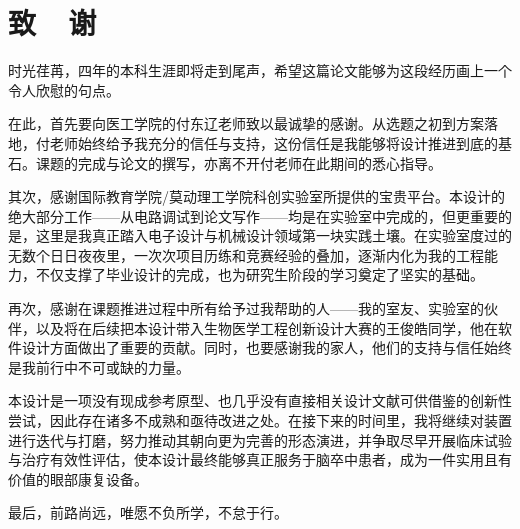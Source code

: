 \chapter*{致\ \ 谢}

\songti\raggedright\setlength{\parindent}{2em}
时光荏苒，四年的本科生涯即将走到尾声，希望这篇论文能够为这段经历画上一个令人欣慰的句点。

在此，首先要向医工学院的付东辽老师致以最诚挚的感谢。从选题之初到方案落地，付老师始终给予我充分的信任与支持，这份信任是我能够将设计推进到底的基石。课题的完成与论文的撰写，亦离不开付老师在此期间的悉心指导。

其次，感谢国际教育学院/莫动理工学院科创实验室所提供的宝贵平台。本设计的绝大部分工作——从电路调试到论文写作——均是在实验室中完成的，但更重要的是，这里是我真正踏入电子设计与机械设计领域第一块实践土壤。在实验室度过的无数个日日夜夜里，一次次项目历练和竞赛经验的叠加，逐渐内化为我的工程能力，不仅支撑了毕业设计的完成，也为研究生阶段的学习奠定了坚实的基础。

再次，感谢在课题推进过程中所有给予过我帮助的人——我的室友、实验室的伙伴，以及将在后续把本设计带入生物医学工程创新设计大赛的王俊皓同学，他在软件设计方面做出了重要的贡献。同时，也要感谢我的家人，他们的支持与信任始终是我前行中不可或缺的力量。

本设计是一项没有现成参考原型、也几乎没有直接相关设计文献可供借鉴的创新性尝试，因此存在诸多不成熟和亟待改进之处。在接下来的时间里，我将继续对装置进行迭代与打磨，努力推动其朝向更为完善的形态演进，并争取尽早开展临床试验与治疗有效性评估，使本设计最终能够真正服务于脑卒中患者，成为一件实用且有价值的眼部康复设备。

最后，前路尚远，唯愿不负所学，不怠于行。


\clearpage

